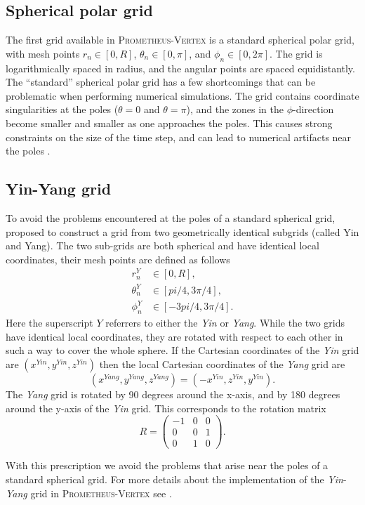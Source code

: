 \subsection{Spherical polar grid}
The first grid available in \textsc{Prometheus-Vertex} is a standard spherical polar grid, 
with mesh points $r_n \in [0, R]$, $\theta_n \in [0, \pi]$, and $\phi_n \in [0, 2\pi]$.
The grid is logarithmically spaced in radius, and the angular points are spaced equidistantly.  
The ``standard'' spherical polar grid has a few shortcomings that
can be problematic when performing numerical simulations. 
The grid contains coordinate singularities at the poles ($\theta = 0$ and $\theta = \pi$),
and the zones in the $\phi$-direction become smaller and smaller as one approaches the poles. 
This causes strong constraints on the size of the time step, and
can lead to numerical artifacts near the poles \citep{wongwathanarat_10a,mueller_15b}.

\subsection{Yin-Yang grid}
To avoid the problems encountered at the poles of a standard spherical grid, \cite{kageyama_04} proposed to
construct a grid from two geometrically identical subgrids (called Yin and Yang). 
The two sub-grids are both spherical and have identical local coordinates, their mesh points are defined as follows
\begin{align}
r_n^{Y} &\in [0, R], \\
\theta_n^{Y} &\in [pi/4, 3\pi/4], \\
\phi_n^{Y} &\in [-3pi/4, 3\pi/4].
\end{align} 
Here the superscript $Y$ referrers to either the \textit{Yin} or \textit{Yang}. While the two grids
have identical local coordinates, they are rotated with respect to each other in such a way
to cover the whole sphere. If 
the Cartesian coordinates of the \textit{Yin} grid are $(x^{Yin},y^{Yin},z^{Yin})$
then the local Cartesian coordinates of the \textit{Yang} grid are
\begin{equation}
(x^{Yang},y^{Yang},z^{Yang}) = (-x^{Yin},z^{Yin},y^{Yin}).
\end{equation} 
The \textit{Yang} grid is rotated by 90 degrees around the x-axis,
and by 180 degrees around the y-axis of the \textit{Yin} grid. 
This corresponds to the rotation matrix
\begin{equation} \label{eqN:pij}
R = 
  \begin{pmatrix}
    -1 & 0 & 0  \\
    0 & 0 & 1 \\
    0 & 1 & 0
  \end{pmatrix}.
\end{equation}

With this prescription we avoid the problems that arise
near the poles of a standard spherical grid.
For more details about the implementation of the \textit{Yin}-\textit{Yang} grid
in \textsc{Prometheus-Vertex} see \cite{melson_phd}.  

